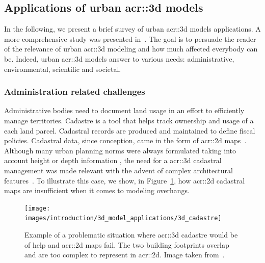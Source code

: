     \subsection{Applications of urban \texorpdfstring{\gls*{acr::3d}}{3D} models}
        \label{subsec::introduction::urban_3d_reconstruction::applications}
        In the following, we present a brief survey of  urban \gls{acr::3d} models applications.
        A more comprehensive study was presented in~\parencite{biljecki2015applications}.
        The goal is to persuade the reader of the relevance of urban \gls{acr::3d} modeling and how much affected everybody can be.
        Indeed, urban \gls{acr::3d} models answer to various needs: administrative, environmental, scientific and societal.

        \subsubsection{Administration related challenges}
            Administrative bodies need to document land usage in an effort to efficiently manage territories.
            Cadastre is a tool that helps track ownership and usage of a each land parcel.
            Cadastral records are produced and maintained to define fiscal policies.
            Cadastral data, since conception, came in the form of \gls{acr::2d} maps~\parencite{billen20033d}.
            Although many urban planning norms were always formulated taking into account height or depth information \parencite{brasebin20183d}, the need for a \gls{acr::3d} cadastral management was made relevant with the advent of complex architectural features~\parencite{biljecki2015applications}.
            To illustrate this case, we show, in Figure~\ref{fig::3d_cadastre_need_example}, how \gls{acr::2d} cadastral maps are insufficient when it comes to modeling overhangs.\\
            \begin{figure}[!htpb]
                \centering
                \texttt{[image: images/introduction/3d\_model\_applications/3d\_cadastre]}
                \caption[
                    Example of a problematic situation where \acrshort*{acr::3d} cadastre would be of help and \acrshort*{acr::2d} maps fail.
                ]{
                    \label{fig::3d_cadastre_need_example}
                    Example of a problematic situation where \acrshort*{acr::3d} cadastre would be of help and \acrshort*{acr::2d} maps fail.
                    The two building footprints overlap and are too complex to represent in \acrshort*{acr::2d}.
                    Image taken from~\parencite{biljecki2015applications}.
                }
            \end{figure}

